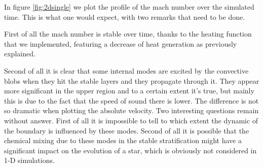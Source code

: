 In figure \ref{fig:2dsingle} we plot the profile of the mach number over the simulated time. This is what one would expect, with two remarks that need to be done. 

First of all the mach number is stable over time, thanks to the heating function that we implemented, featuring a decrease of heat generation as previously explained. 

Second of all it is clear that some internal modes are excited by the convective blobs when they hit the stable layers and they propagate through it. They appear more significant in the upper region and to a certain extent it's true, but mainly this is due to the fact that the speed of sound there is lower. The difference is not so dramatic when plotting the absolute velocity. Two interesting questions remain without answer. First of all it is impossible to tell to which extent the dynamic of the boundary is influenced by these modes. Second of all it is possible that the chemical mixing due to these modes in the stable stratification might have a significant impact on the evolution of a star, which is obviously not considered in 1-D simulations.

